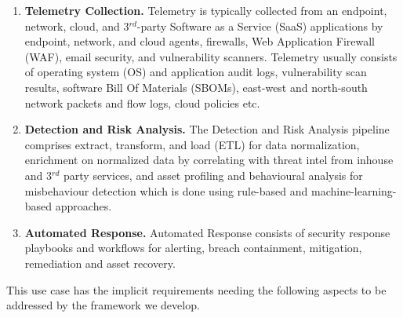 \begin{enumerate}

\item{\bf Telemetry Collection.} Telemetry is typically collected from an endpoint, 
network, cloud, and 3$^{rd}$-party Software as a Service (SaaS) applications by endpoint, network, and cloud agents, 
firewalls, Web Application Firewall (WAF), email security, and vulnerability scanners. Telemetry usually consists 
of operating system (OS) and application audit logs, vulnerability scan results, software Bill Of Materials (SBOMs), east-west and 
north-south network packets and flow logs, cloud policies etc.

\item{\bf Detection and Risk Analysis.} The Detection and Risk Analysis pipeline 
comprises  extract, transform, and load (ETL) for data normalization, enrichment on normalized data by correlating 
with threat intel from inhouse and 3$^{rd}$ party services, and asset profiling and
behavioural analysis for misbehaviour detection which is done using rule-based 
and machine-learning-based approaches.

\item{\bf Automated Response.} Automated Response consists of security response 
playbooks and workflows for alerting, breach containment, mitigation, remediation 
and asset recovery.

\end{enumerate}

This use case has the implicit requirements needing the following
aspects to be addressed by the framework we develop.

